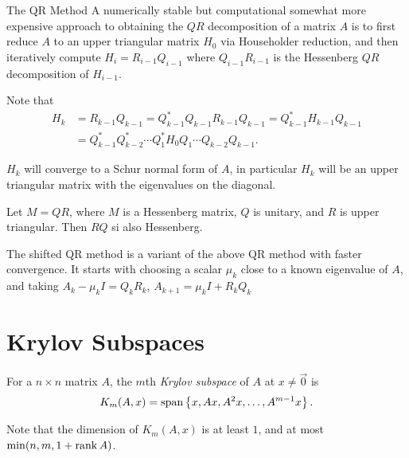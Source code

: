 \begin{defn}{The QR Method}\proofbreak
    A numerically stable but computational somewhat more expensive approach to obtaining the $QR$ decomposition of a matrix $A$ is to first reduce $A$ to an upper triangular matrix $H_0$ via Householder reduction, and then iteratively compute $H_i = R_{i-1}Q_{i-1}$ where $Q_{i-1}R_{i-1}$ is the Hessenberg $QR$ decomposition of $H_{i-1}$.

    Note that
    \begin{align*}
        H_k &= R_{k-1}Q_{k-1} = Q_{k-1}^{*}Q_{k-1}R_{k-1}Q_{k-1} = Q_{k-1}^{*}H_{k-1}Q_{k-1} \\
        &= Q_{k-1}^{*}Q_{k-2}^{*}\cdots Q_{1}^{*}H_0Q_1 \cdots Q_{k-2}Q_{k-1}.
    \end{align*}

    $H_k$ will converge to a Schur normal form of $A$, in particular $H_k$ will be an upper triangular matrix with the eigenvalues on the diagonal.
\end{defn}

\begin{prop}\label{hessenberg-qr-swap}
    Let $M = QR$, where $M$ is a Hessenberg matrix, $Q$ is unitary, and $R$ is upper triangular. Then $RQ$ si also Hessenberg.
\end{prop}

\begin{defn}
    The shifted QR method is a variant of the above QR method with faster convergence. It starts with choosing a scalar $\mu_k$ close to a known eigenvalue of $A$, and taking $A_{k} - \mu_kI = Q_{k}R_{k}$, $A_{k+1} = \mu_kI + R_{k}Q_{k}$
\end{defn}

\section{Krylov Subspaces}

\begin{defn}
    For a $n \times n$ matrix $A$, the $m$th \emph{Krylov subspace} of $A$ at $x \neq \vec{0}$ is
    \begin{align*}
        K_m(A, x) = \operatorname{span}\left\{x, Ax, A^2x, \ldots, A^{m-1}x\right\}.
    \end{align*}
\end{defn}

\begin{rmk}
    Note that the dimension of $K_m(A, x)$ is at least $1$, and at most $\min(n, m, 1 + \operatorname{rank} A)$.
\end{rmk}

